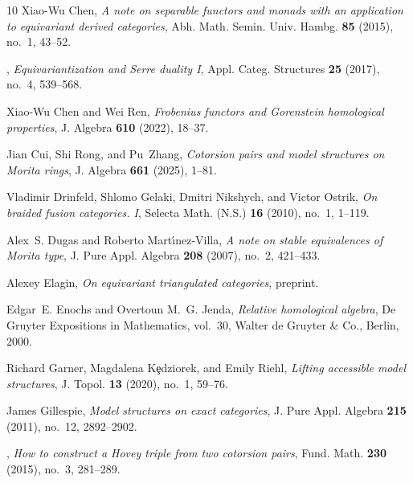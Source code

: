 \documentclass[12pt,twoside]{amsart}
\theoremstyle{bfupright head,slanted body}
\theoremstyle{bfupright head,upright body}
\theoremstyle{fixed bf head,slanted body}
\theoremstyle{fixed bf head,upright body}
\theoremstyle{numbered paragraph}
\numberwithin{equation}{res}
\begin{document}
\begin{thebibliography}{10}
Xiao-Wu Chen, \emph{A note on separable functors and monads with an application
  to equivariant derived categories}, Abh. Math. Semin. Univ. Hambg.
  \textbf{85} (2015), no.~1, 43--52. 

\bysame, \emph{Equivariantization and {S}erre duality {I}}, Appl. Categ.
  Structures \textbf{25} (2017), no.~4, 539--568. 

Xiao-Wu Chen and Wei Ren, \emph{Frobenius functors and {G}orenstein homological
  properties}, J. Algebra \textbf{610} (2022), 18--37. 

Jian Cui, Shi Rong, and Pu~Zhang, \emph{Cotorsion pairs and model structures on
  {M}orita rings}, J. Algebra \textbf{661} (2025), 1--81. 

Vladimir Drinfeld, Shlomo Gelaki, Dmitri Nikshych, and Victor Ostrik, \emph{On
  braided fusion categories. {I}}, Selecta Math. (N.S.) \textbf{16} (2010),
  no.~1, 1--119. 

Alex~S. Dugas and Roberto Mart\'{\i}nez-Villa, \emph{A note on stable
  equivalences of {M}orita type}, J. Pure Appl. Algebra \textbf{208} (2007),
  no.~2, 421--433. 

Alexey Elagin, \emph{On equivariant triangulated categories}, preprint.

Edgar~E. Enochs and Overtoun M.~G. Jenda, \emph{Relative homological algebra},
  De Gruyter Expositions in Mathematics, vol.~30, Walter de Gruyter \& Co.,
  Berlin, 2000. 

Richard Garner, Magdalena K\c{e}dziorek, and Emily Riehl, \emph{Lifting
  accessible model structures}, J. Topol. \textbf{13} (2020), no.~1, 59--76.

James Gillespie, \emph{Model structures on exact categories}, J. Pure Appl.
  Algebra \textbf{215} (2011), no.~12, 2892--2902. 

\bysame, \emph{How to construct a {H}ovey triple from two cotorsion pairs},
  Fund. Math. \textbf{230} (2015), no.~3, 281--289. 



\end{thebibliography}
\end{document}
